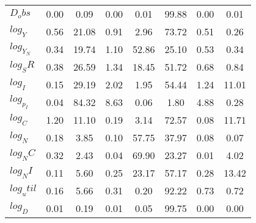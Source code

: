 \begin{center}
\begin{longtable}{lccccccc}
$D_obs     $	 & 	        0.00	 & 	        0.09	 & 	        0.00	 & 	        0.01	 & 	       99.88	 & 	        0.00	 & 	        0.01 \\ 
$log_Y     $	 & 	        0.56	 & 	       21.08	 & 	        0.91	 & 	        2.96	 & 	       73.72	 & 	        0.51	 & 	        0.26 \\ 
$log_Y_N   $	 & 	        0.34	 & 	       19.74	 & 	        1.10	 & 	       52.86	 & 	       25.10	 & 	        0.53	 & 	        0.34 \\ 
$log_SR    $	 & 	        0.38	 & 	       26.59	 & 	        1.34	 & 	       18.45	 & 	       51.72	 & 	        0.68	 & 	        0.84 \\ 
$log_I     $	 & 	        0.15	 & 	       29.19	 & 	        2.02	 & 	        1.95	 & 	       54.44	 & 	        1.24	 & 	       11.01 \\ 
$log_p_I   $	 & 	        0.04	 & 	       84.32	 & 	        8.63	 & 	        0.06	 & 	        1.80	 & 	        4.88	 & 	        0.28 \\ 
$log_C     $	 & 	        1.20	 & 	       11.10	 & 	        0.19	 & 	        3.14	 & 	       72.57	 & 	        0.08	 & 	       11.71 \\ 
$log_N     $	 & 	        0.18	 & 	        3.85	 & 	        0.10	 & 	       57.75	 & 	       37.97	 & 	        0.08	 & 	        0.07 \\ 
$log_NC    $	 & 	        0.32	 & 	        2.43	 & 	        0.04	 & 	       69.90	 & 	       23.27	 & 	        0.01	 & 	        4.02 \\ 
$log_NI    $	 & 	        0.11	 & 	        5.60	 & 	        0.25	 & 	       23.17	 & 	       57.17	 & 	        0.28	 & 	       13.42 \\ 
$log_util  $	 & 	        0.16	 & 	        5.66	 & 	        0.31	 & 	        0.20	 & 	       92.22	 & 	        0.73	 & 	        0.72 \\ 
$log_D     $	 & 	        0.01	 & 	        0.19	 & 	        0.01	 & 	        0.05	 & 	       99.75	 & 	        0.00	 & 	        0.00 \\ 
\end{longtable}
 \end{center}
